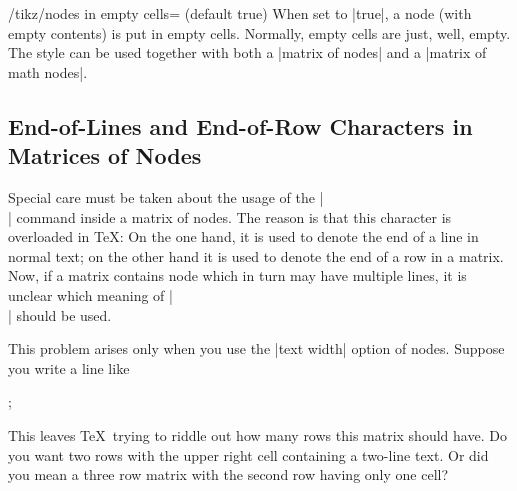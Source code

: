 \begin{key}{/tikz/nodes in empty cells= (default true)}
    When set to |true|, a node (with empty contents) is put in empty cells.
    Normally, empty cells are just, well, empty. The style can be used together
    with both a |matrix of nodes| and a |matrix of math nodes|.
\begin{codeexample}[preamble={\usetikzlibrary{matrix}}]
\end{codeexample}
\begin{codeexample}[preamble={\usetikzlibrary{matrix}}]
\end{codeexample}
\end{key}


\subsection{End-of-Lines and End-of-Row Characters in Matrices of Nodes}

Special care must be taken about the usage of the |\\| command inside a matrix
of nodes. The reason is that this character is overloaded in \TeX: On the one
hand, it is used to denote the end of a line in normal text; on the other hand
it is used to denote the end of a row in a matrix. Now, if a matrix contains
node which in turn may have multiple lines, it is unclear which meaning of |\\|
should be used.

This problem arises only when you use the |text width| option of nodes. Suppose
you write a line like
%
\begin{codeexample}
;
\end{codeexample}
%
This leaves \TeX\ trying to riddle out how many rows this matrix should have.
Do you want two rows with the upper right cell containing a two-line text. Or
did you mean a three row matrix with the second row having only one cell?

